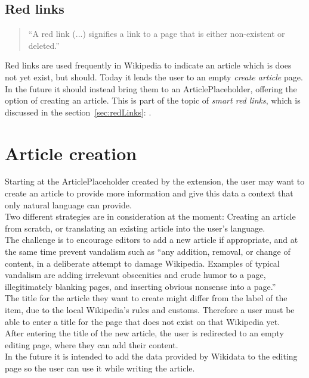 \subsection{Red links}
\begin{quotation}
``A red link (...) signifies a link to a page that is either non-existent or deleted.'' \citep{wiki:01} 
\end{quotation}

Red links are used frequently in Wikipedia to indicate an article which is does not yet exist, but should. Today it leads the user to an empty \textit{create article} page. In the future it should instead bring them to an ArticlePlaceholder, offering the option of creating an article. This is part of the topic of \textit{smart red links}, which is discussed in the section~\ref{sec:redLinks}: .

\section{Article creation}
Starting at the ArticlePlaceholder created by the extension, the user may want to create an article to provide more information and give this data a context that only natural language can provide. \\
Two different strategies are in consideration at the moment: Creating an article from scratch, or translating an existing article into the user's language. \\
The challenge is to encourage editors to add a new article if appropriate, and at the same time prevent vandalism such as ``any addition, removal, or change of content, in a deliberate attempt to damage Wikipedia. Examples of typical vandalism are adding irrelevant obscenities and crude humor to a page, illegitimately blanking pages, and inserting obvious nonsense into a page.'' \citep{wiki:33} \\ 
The title for the article they want to create might differ from the label of the item, due to the local Wikipedia's rules and customs. Therefore a user must be able to enter a title for the page that does not exist on that Wikipedia yet. \\
After entering the title of the new article, the user is redirected to an empty editing page, where they can add their content. \\
In the future it is intended to add the data provided by Wikidata to the editing page so the user can use it while writing the article. 

